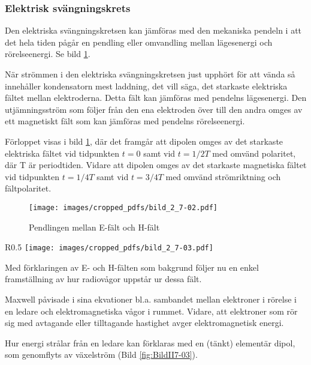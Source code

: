 \subsubsection{Elektrisk svängningskrets}

Den elektriska svängningskretsen kan jämföras med den mekaniska
pendeln i att det hela tiden pågår en pendling eller omvandling mellan
lägesenergi och rörelseenergi. Se bild \ref{fig:BildII7-02}.

När strömmen i den elektriska svängningskretsen just upphört för att
vända så innehåller kondensatorn mest laddning, det vill säga, det
starkaste elektriska fältet mellan elektroderna.
Detta fält kan jämföras med pendelns lägesenergi.
Den utjämningsström som följer från den ena elektroden över till den
andra omges av ett magnetiskt fält som kan jämföras med pendelns
rörelseenergi.

Förloppet visas i bild \ref{fig:BildII7-02}, där det framgår att dipolen omges
av det starkaste elektriska fältet vid tidpunkten \(t=0\) samt vid
\(t=1/2T\) med omvänd polaritet, där T är periodtiden.
Vidare att dipolen omges av det starkaste magnetiska fältet vid tidpunkten
\(t=1/4T\) samt vid \(t=3/4T\) med omvänd strömriktning och fältpolaritet.

\begin{figure}
\texttt{[image: images/cropped\_pdfs/bild\_2\_7-02.pdf]}
\caption{Pendlingen mellan E-fält och H-fält}
\label{fig:BildII7-02}
\end{figure}

\begin{wrapfigure}{R}{0.5\textwidth}
\texttt{[image: images/cropped\_pdfs/bild\_2\_7-03.pdf]}
\caption{Elementär dipol}
\label{fig:BildII7-03}
\end{wrapfigure}

Med förklaringen av E- och H-fälten som bakgrund följer nu en enkel
framställning av hur radiovågor uppstår ur dessa fält.

Maxwell påvisade i sina ekvationer bl.a. sambandet mellan elektroner
i rörelse i en ledare och elektromagnetiska vågor i rummet.
Vidare, att elektroner som rör sig med avtagande eller tilltagande hastighet
avger elektromagnetisk energi.

Hur energi strålar från en ledare kan förklaras med en (tänkt)
elementär dipol, som genomflyts av växelström (Bild \ref{fig:BildII7-03}).

